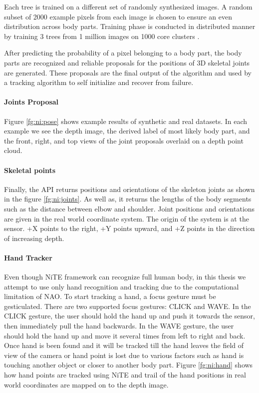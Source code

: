 

Each tree is trained on a different set of randomly synthesized images. A random subset of 2000 example pixels from each image is chosen to ensure an even distribution across body parts. Training phase is conducted in distributed manner by training 3 trees from 1 million images on 1000 core clusters \cite{13}.

After predicting the probability of a pixel belonging to a body part, the body parts are recognized and reliable proposals for the positions of 3D skeletal joints are generated. These proposals are the final output of the algorithm and used by a tracking algorithm to self initialize and recover from failure.



\paragraph*{Joints Proposal} Figure \ref{fg:ni:pose} shows example results of synthetic and real datasets. In each example we see the depth image, the derived label of most likely body part, and the front, right, and top views of the joint proposals overlaid on a depth point cloud.

\paragraph*{Skeletal points} Finally, the API returns positions and orientations of the skeleton joints as shown in the figure \ref{fg:ni:joints}. As well as, it returns the lengths of the body segments such as the distance between elbow and shoulder. Joint positions and orientations are given in the real world coordinate system. The origin of the system is at the sensor. +X points to the right, +Y points upward, and +Z points in the direction of increasing depth. 



\paragraph*{Hand Tracker} Even though NiTE framework can recognize full human body, in this thesis we attempt to use only hand recognition and tracking due to the computational limitation of NAO. To start tracking a hand, a focus gesture must be gesticulated. There are two supported focus gestures: CLICK and WAVE. In the CLICK gesture, the user should hold the hand up and push it towards the sensor, then immediately pull the hand backwards. In the WAVE gesture, the user should hold the hand up and move it several times from left to right and back. Once hand is been found and it will be tracked till the hand leaves the field of view of the camera or hand point is lost due to various factors such as hand is touching another object or closer to another body part. Figure \ref{fg:ni:hand} shows how hand points are tracked using NiTE and trail of the hand positions in real world coordinates are mapped on to the depth image.

